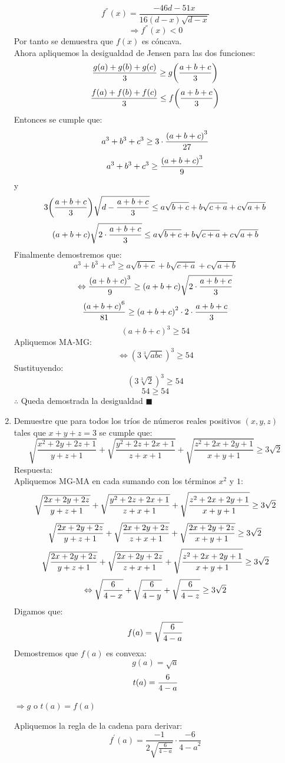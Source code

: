 \documentclass{book}
\begin{document}
\begin{enumerate}
        $$f^{''}(x)=\frac{-46d-51x}{16(d-x) \sqrt{d-x}}$$
        $$\Rightarrow f^{''}(x)<0$$
        Por tanto se demuestra que $f(x)$ es cóncava.\\
        Ahora apliquemos la desigualdad de Jensen para las dos funciones:
        $$\frac{g(a)+g(b)+g(c)}{3}\geq g\bigg({a+b+c\over 3}\bigg)$$
        $$\frac{f(a)+f(b)+f(c)}{3}\leq f\bigg({a+b+c\over 3}\bigg)$$
        Entonces se cumple que:
        $$a^3+b^3+c^3\geq 3\cdot{{(a+b+c)}^3\over 27}$$
        $$a^3+b^3+c^3\geq {{(a+b+c)}^3\over 9}$$
        y
        $$3\bigg({a+b+c\over 3}\bigg) \sqrt{d-{a+b+c\over 3}}\leq a\sqrt{b+c}+b\sqrt{c+a}+c\sqrt{a+b}$$
        $$(a+b+c) \sqrt{2\cdot{a+b+c\over 3}}\leq a\sqrt{b+c}+b\sqrt{c+a}+c\sqrt{a+b}$$
        Finalmente demostremos que:
        $$a^3+b^3+c^3\geq a\sqrt{b+c}+b\sqrt{c+a}+c\sqrt{a+b}$$
        $$\Leftrightarrow {{(a+b+c)}^3\over 9}\geq (a+b+c) \sqrt{2\cdot{a+b+c\over 3}}$$
        $${{(a+b+c)}^6\over 81}\geq{(a+b+c)}^2\cdot 2\cdot{a+b+c\over 3}$$
        $${(a+b+c)}^3\geq 54$$
        Apliquemos MA-MG:
        $$\Leftrightarrow {(3\sqrt[3]{abc})}^3\geq 54$$
        Sustituyendo:
        $${(3\sqrt[3]{2})}^3\geq 54$$
        $$54\geq 54$$
        $\therefore$ Queda demostrada la desigualdad $\blacksquare$\\
        \item Demuestre que para todos los tríos de números reales positivos $(x,y,z)$ tales que $x+y+z= 3$ se cumple que:
        $$\sqrt{\frac{x^2+2y+2z+1}{y+z+1}}+\sqrt{\frac{y^2+2z+2x+1}{z+x+1}}+\sqrt{\frac{z^2+2x+2y+1}{x+y+1}}\geq3\sqrt{2}$$
        Respuesta:\\
        Apliquemos MG-MA en cada sumando con los términos $x^2$ y $1$:
        $$\sqrt{{2x+2y+2z\over y+z+1}}+\sqrt{\frac{y^2+2z+2x+1}{z+x+1}}+\sqrt{\frac{z^2+2x+2y+1}{x+y+1}}\geq3\sqrt{2}$$
        $$\sqrt{{2x+2y+2z\over y+z+1}}+\sqrt{{2x+2y+2z\over z+x+1}}+\sqrt{{2x+2y+2z\over x+y+1}}\geq 3\sqrt{2}$$
        $$\sqrt{{2x+2y+2z\over y+z+1}}+\sqrt{{2x+2y+2z\over z+x+1}}+\sqrt{\frac{z^2+2x+2y+1}{x+y+1}}\geq3\sqrt{2}$$
        $$\Leftrightarrow\sqrt{{6\over 4-x}}+\sqrt{{6\over 4-y}}+\sqrt{{6\over 4-z}}\geq 3\sqrt{2}$$
        Digamos que:
        $$f(a)=\sqrt{{6\over 4-a}}$$
        Demostremos que $f(a)$ es convexa:
        $$g(a)=\sqrt{a}$$
        $$t(a)={6\over 4-a}$$
        \begin{center}
            $\Rightarrow g$ o $ t(a)=f(a)$
        \end{center}
        Apliquemos la regla de la cadena para derivar:
        $$f^{'} (a)=\frac{-1}{2\sqrt{\frac{6}{4-a}}}\cdot\frac{-6}{{4-a}^2}$$

\end{enumerate}
\end{document}
